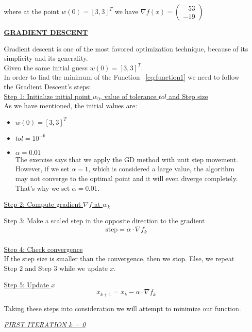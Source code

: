 where at the point $w\left(0\right) = \left[3, 3\right]^T$ we have $\nabla f(x) = \left(\begin{array}{c}
	-53 \\
	-19
\end{array}\right)$
\\[4mm]

\begin{center}
	\underline{\textbf{GRADIENT DESCENT}}
\end{center}
Gradient descent is one of the most favored optimization technique, because of its simplicity and its generality.\\
Given the same initial guess $w\left(0\right) = \left[3, 3\right]^T$. \\
In order to find the minimum of the Function ~\ref{eq:function1} we need to follow the Gradient Descent's steps:\\

\underline{Step 1: Initialize initial point $w_{0}$, value of tolerance $tol$ and Step size}\\
As we have mentioned, the initial values are:
\begin{itemize}
	\item $w\left(0\right) = \left[3, 3\right]^T$
	\item $tol = 10^{-6}$
	\item $\alpha = 0.01$\\
	The exercise says that we apply the GD method with unit step movement. However, if we set $\alpha = 1$, which is considered a large value, the algorithm may not converge to the optimal point and it will even diverge completely. That's why we set $\alpha = 0.01$. 
\end{itemize} 
\vspace{2mm}

\underline{Step 2: Compute gradient $\nabla f$ at $w_{k}$}
\vspace{4mm}

\underline{Step 3: Make a scaled step in the opposite direction to the gradient}\\
\begin{equation}
	\begin{gathered}
		\text{step} = \alpha \cdot \nabla f_{k}\\
	\end{gathered}
\end{equation}
\vspace{2mm}

\underline{Step 4: Check convergence}\\
If the step size is smaller than the convergence, then we stop. Else, we repeat Step 2 and Step 3 while we update $x$.
\vspace{4mm}

\underline{Step 5: Update $x$}
\begin{equation}
	x_{k+1} = x_{k} - \alpha \cdot \nabla f_{k}
\end{equation}
\vspace{4mm}

Taking these steps into consideration we will attempt to minimize our function.\\

\begin{center}
	\underline{\textit{FIRST ITERATION k = 0}}
\end{center}




